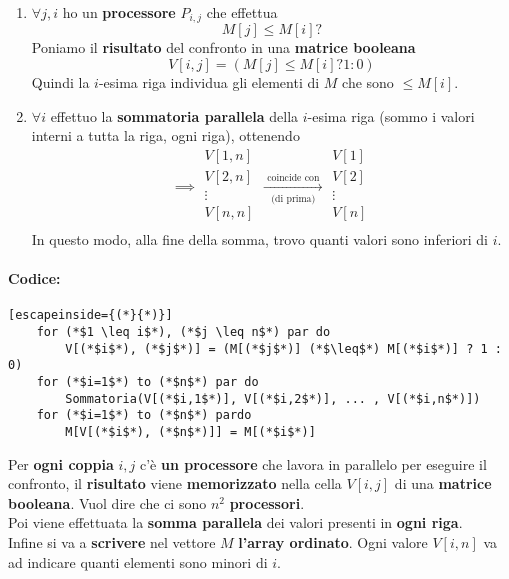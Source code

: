 \begin{enumerate}
	\item $\forall j,i$ ho un \textbf{processore} $P_{i,j}$ che effettua 
	$$ M[j] \leq M[i] ? $$
	Poniamo il \textbf{risultato} del confronto in una \textbf{matrice booleana}
	$$ V[i,j] = (M[j] \leq M[i] ? 1 : 0 )$$
	Quindi la $i$-esima riga individua gli elementi di $M$ che sono $\leq M[i]$.\\
	
	\item $\forall i$ effettuo la \textbf{sommatoria parallela} della $i$-esima riga (sommo i valori interni a tutta la riga, ogni riga), ottenendo
	$$
	\implies \begin{array}{c}
		V[1,n] \\
		V[2,n] \\
		\vdots \\
		V[n,n] \\
	\end{array}
	\xrightarrow[\text{ (di prima) }]{\text{ coincide con }}
	\begin{array}{c}
		V[1] \\
		V[2] \\
		\vdots \\
		V[n] \\
	\end{array}
	$$
	In questo modo, alla fine della somma, trovo quanti valori sono inferiori di $i$.\\
\end{enumerate}

\paragraph{Codice:} 
\begin{lstlisting}[escapeinside={(*}{*)}]
	for (*$1 \leq i$*), (*$j \leq n$*) par do
		V[(*$i$*), (*$j$*)] = (M[(*$j$*)] (*$\leq$*) M[(*$i$*)] ? 1 : 0)
	for (*$i=1$*) to (*$n$*) par do
		Sommatoria(V[(*$i,1$*)], V[(*$i,2$*)], ... , V[(*$i,n$*)])
	for (*$i=1$*) to (*$n$*) pardo
		M[V[(*$i$*), (*$n$*)]] = M[(*$i$*)]
\end{lstlisting}

Per \textbf{ogni coppia} $i,j$ c'è \textbf{un processore} che lavora in parallelo per eseguire il confronto, il \textbf{risultato} viene \textbf{memorizzato} nella cella $V[i,j]$ di una \textbf{matrice booleana}. Vuol dire che ci sono $n^2$ \textbf{processori}.\\
Poi viene effettuata la \textbf{somma parallela} dei valori presenti in \textbf{ogni riga}.\\
Infine si va a \textbf{scrivere} nel vettore $M$ \textbf{l'array ordinato}. Ogni valore $V[i,n]$ va ad indicare quanti elementi sono minori di $i$.\\

